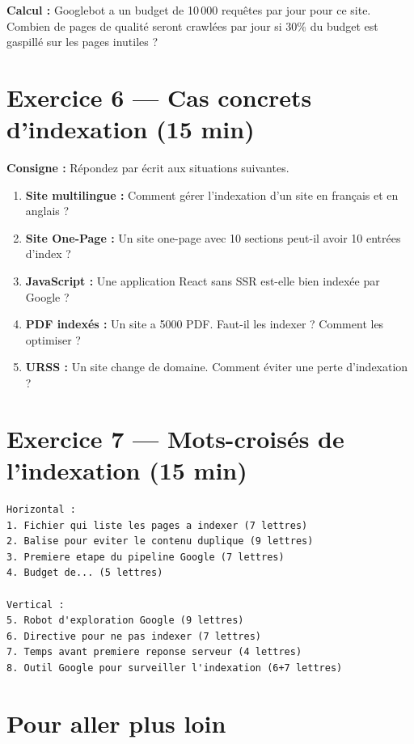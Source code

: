 \documentclass[12pt,a4paper]{report}
\begin{document}
\textbf{Calcul :} Googlebot a un budget de 10\,000 requ\^{e}tes par jour pour ce site. Combien de pages de qualit\'{e} seront crawl\'{e}es par jour si 30\% du budget est gaspill\'{e} sur les pages inutiles ?

\section{Exercice 6 --- Cas concrets d'indexation (15 min)}

\textbf{Consigne :} R\'{e}pondez par \'{e}crit aux situations suivantes.

\begin{enumerate}
    \item \textbf{Site multilingue :} Comment g\'{e}rer l'indexation d'un site en fran\c{c}ais et en anglais ?
    \item \textbf{Site One-Page :} Un site one-page avec 10 sections peut-il avoir 10 entr\'{e}es d'index ?
    \item \textbf{JavaScript :} Une application React sans SSR est-elle bien index\'{e}e par Google ?
    \item \textbf{PDF index\'{e}s :} Un site a 5000 PDF. Faut-il les indexer ? Comment les optimiser ?
    \item \textbf{URSS :} Un site change de domaine. Comment \'{e}viter une perte d'indexation ?
\end{enumerate}

\section{Exercice 7 --- Mots-crois\'{e}s de l'indexation (15 min)}

\begin{lstlisting}
Horizontal :
1. Fichier qui liste les pages a indexer (7 lettres)
2. Balise pour eviter le contenu duplique (9 lettres)
3. Premiere etape du pipeline Google (7 lettres)
4. Budget de... (5 lettres)

Vertical :
5. Robot d'exploration Google (9 lettres)
6. Directive pour ne pas indexer (7 lettres)
7. Temps avant premiere reponse serveur (4 lettres)
8. Outil Google pour surveiller l'indexation (6+7 lettres)
\end{lstlisting}

\section{Pour aller plus loin}
\end{document}
